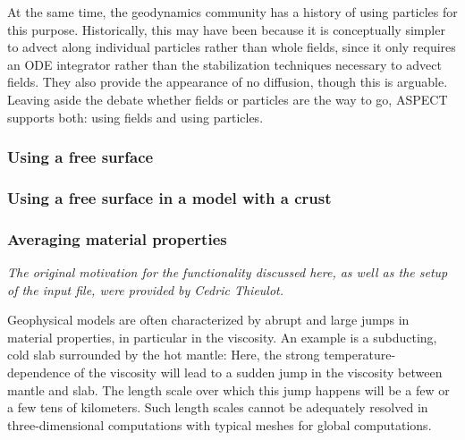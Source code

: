 \documentclass{article}
\newcommand{\aspect}{\textsc{ASPECT}}
\begin{document}
At the same time, the geodynamics community has a history of using particles for
this purpose. Historically, this may have been because it is conceptually
simpler to advect along individual particles rather than whole fields, since it
only requires an ODE integrator rather than the stabilization techniques
necessary to advect fields. They also provide the appearance of no diffusion,
though this is arguable. Leaving aside the debate whether fields or particles are the
way to go, \aspect{} supports both: using fields and using particles.










\subsubsection{Using a free surface}
\label{sec:cookbooks-freesurface}



\subsubsection{Using a free surface in a model with a crust}
\label{sec:cookbooks-freesurfaceWC}



\subsubsection{Averaging material properties}
\label{sec:sinker-with-averaging}

\textit{The original motivation for the functionality discussed here, as well
  as the setup of the input file, were provided by Cedric Thieulot.}

Geophysical models are often characterized by abrupt and large jumps in material
properties, in particular in the viscosity. An example is a subducting, cold
slab surrounded by the hot mantle: Here, the strong
temperature-dependence of the viscosity will lead to a sudden jump in the
viscosity between mantle and slab. The length scale over which this jump happens
will be a few or a few tens of kilometers. Such length scales cannot be
adequately resolved in three-dimensional computations with typical meshes for
global computations.
\end{document}
